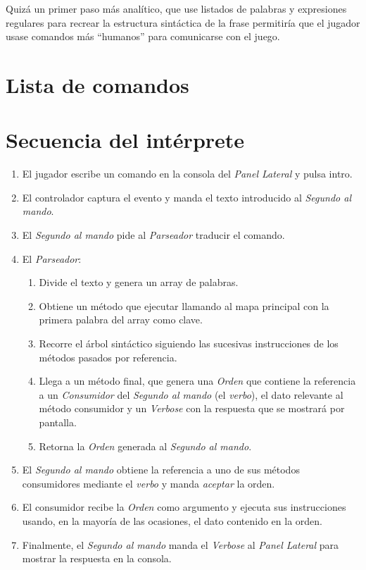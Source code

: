 \documentclass[a4paper,
	11pt,
	parskip=full,
	bibliography=totoc,
	twoside
	]{scrartcl}
\let\oldsection\section
\def\section{\cleardoubleoddpage\oldsection}
\renewcommand{\sectionmark}[1]{\markright{\thesection.\ #1}}
\begin{document}
		Quizá un primer paso más analítico, que use listados de palabras y expresiones regulares para recrear la estructura sintáctica de la frase permitiría que el jugador usase comandos más ``humanos'' para comunicarse con el juego.

\cleardoubleoddpage
	\renewcommand{\sectionmark}[1]{}
\begin{thebibliography}{99}
	\raggedright
	
\end{thebibliography}
\markright{\appendixname}

\cleardoubleoddpage
\appendix
{}

\section{Lista de comandos}
\label{app:command_list}
	
	
\section{Secuencia del intérprete}
\label{app:interpreter}
	\begin{enumerate}[noitemsep]
		\item El jugador escribe un comando en la consola del \textit{Panel Lateral} y pulsa intro.
		\item El controlador captura el evento y manda el texto introducido al \textit{Segundo al mando}.
		\item El \textit{Segundo al mando} pide al \textit{Parseador} traducir el comando.
		\item El \textit{Parseador}:
		\begin{enumerate}[noitemsep]
			\item Divide el texto y genera un array de palabras.
			\item Obtiene un método que ejecutar llamando al mapa principal con la primera palabra del array como clave.
			\item Recorre el árbol sintáctico siguiendo las sucesivas instrucciones de los métodos pasados por referencia.
			\item Llega a un método final, que genera una \textit{Orden} que contiene la referencia a un \textit{Consumidor} del \textit{Segundo al mando} (el \textit{verbo}), el dato relevante al método consumidor y un \textit{Verbose} con la respuesta que se mostrará por pantalla.
			\item Retorna la \textit{Orden} generada al \textit{Segundo al mando}.
		\end{enumerate}
		\item El \textit{Segundo al mando} obtiene la referencia a uno de sus métodos consumidores mediante el \textit{verbo} y manda \textit{aceptar} la orden.
		\item El consumidor recibe la \textit{Orden} como argumento y ejecuta sus instrucciones usando, en la mayoría de las ocasiones, el dato contenido en la orden.
		\item Finalmente, el \textit{Segundo al mando} manda el \textit{Verbose} al \textit{Panel Lateral} para mostrar la respuesta en la consola.
	\end{enumerate}
\end{document}
